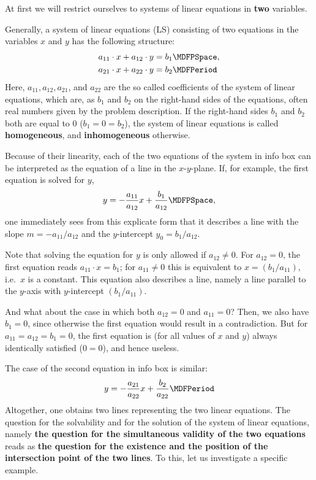 \begin{MIntro}
At first we will restrict ourselves to systems of linear equations in \textbf{two}
variables. 

\begin{MInfo}
Generally, a system of linear equations (LS) consisting of two equations 
in the variables $x$ and $y$ has the following structure:
\begin{eqnarray*}
	a_{11} \cdot x + a_{12} \cdot y &= b_{1} \MDFPSpace, \\ 
	a_{21} \cdot x + a_{22} \cdot y &= b_2 \MDFPeriod
\end{eqnarray*}
Here, $a_{11}, a_{12}, a_{21}$, and $a_{22}$ are the so called coefficients of the system
of linear equations, which are, as $b_1$ and $b_2$ on the right-hand sides of the 
equations, often real numbers given by the problem description.
If the right-hand sides $b_1$ and $b_2$ both are equal to $0$ ($b_1 = 0 = b_2$), 
the system of linear equations is called \textbf{homogeneous}, and \textbf{inhomogeneous}
otherwise.


\end{MInfo}

Because of their linearity, each of the two equations of the system in info box 
can be interpreted as the equation of a line in the $x$-$y$-plane. If, for example, the first equation
is solved for $y$,
$$y = - \Mdfrac{a_{11}}{a_{12}} x + \Mdfrac{b_1}{a_{12}} \MDFPSpace ,$$
one immediately sees from this explicate form that it describes a line with the slope 
$m = - a_{11}/a_{12}$ and the $y$-intercept $y_0=b_1/a_{12}$.

Note that solving the equation for $y$ is only allowed if $a_{12} \neq 0$. For $a_{12} = 0$,
the first equation reads $a_{11} \cdot x = b_1$; for $a_{11} \neq 0$ this is equivalent 
to $x = (b_1/a_{11})$, i.e.\ $x$ is a constant. This equation also describes a line, namely 
a line parallel to the $y$-axis with $y$-intercept $(b_1/a_{11})$.

And what about the case in which both $a_{12} = 0$ and $a_{11} = 0$? Then, we also have $b_1 = 0$, since 
otherwise the first equation would result in a contradiction. But for $a_{11} = a_{12} = b_1 = 0$,
the first equation is (for all values of $x$ and $y$) always identically satisfied ($0 = 0$),
and hence useless.

The case of the second equation in info box  is similar:
$$y = - \Mdfrac{a_{21}}{a_{22}} x + \Mdfrac{b_2}{a_{22}} \MDFPeriod$$
Altogether, one obtains two lines representing the two linear equations. The question
for the solvability and for the solution of the system of linear equations, namely 
\textbf{the question for the simultaneous validity of the two equations} reads as \textbf{the question for
the existence and the position of the intersection point of the two lines}. 
To this, let us investigate a specific example.


\end{MIntro}
